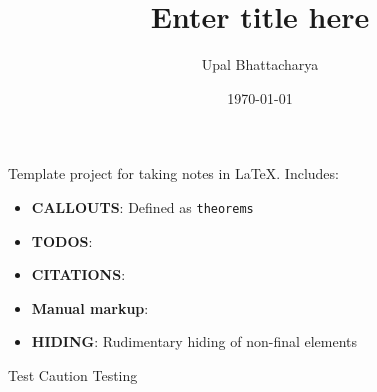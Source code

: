 \documentclass[a4paper,colorinlistoftodos]{article}
\author{Upal Bhattacharya}
\date{\today}
\title{Enter title here}
\begin{document}
\maketitle

\begingroup
    \hypersetup{linkcolor=black}
    \tableofcontents
    \listoftodos
    \pagebreak
\endgroup

\linenumbers

Template project for taking notes in \LaTeX.
Includes:
\begin{itemize}
\item \textbf{CALLOUTS}: Defined as \verb|theorems|
\item \textbf{TODOS}:
\item \textbf{CITATIONS}: \cite{openai2024HelloGpt4o}
\item \textbf{Manual markup}: 
\item \textbf{HIDING}: Rudimentary hiding of non-final elements
\end{itemize}

\begin{caution}{Test Caution}{}
Testing
\end{caution}




\end{document}

